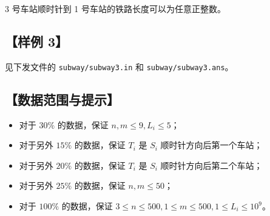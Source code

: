 \documentclass[11pt,a4paper,oneside]{article}
\begin{document}
3 号车站顺时针到 1 号车站的铁路长度可以为任意正整数。

\subsection*{【样例 3】}

见下发文件的 \texttt{subway/subway3.in} 和 \texttt{subway/subway3.ans}。

\subsection*{【数据范围与提示】}

\begin{itemize}
  \item 对于 $30\%$ 的数据，保证 $n,m \le 9,L_i \le 5$；
  \item 对于另外 $15\%$ 的数据，保证 $T_i$ 是 $S_i$ 顺时针方向后第一个车站；
  \item 对于另外 $20\%$ 的数据，保证 $T_i$ 是 $S_i$ 顺时针方向后第二个车站；
  \item 对于另外 $25\%$ 的数据，保证 $n,m \le 50$；
  \item 对于 $100\%$ 的数据，保证 $3 \le n \le 500,1 \le m \le 500,1 \le L_i \le 10^9$。
\end{itemize}
\end{document}
